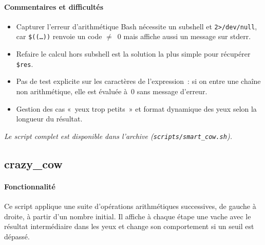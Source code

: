 \documentclass[a4paper,french,11pt]{article}
\begin{document}
\paragraph{Commentaires et difficultés}  
\begin{itemize}
  \item Capturer l’erreur d’arithmétique Bash nécessite un subshell et \texttt{2>/dev/null}, car \texttt{\$((…))} renvoie un code $\ne$ 0 mais affiche aussi un message sur stderr.  
  \item Refaire le calcul hors subshell est la solution la plus simple pour récupérer \texttt{\$res}.  
  \item Pas de test explicite sur les caractères de l’expression : si on entre une chaîne non arithmétique, elle est évaluée à 0 sans message d’erreur.  
  \item Gestion des cas « yeux trop petits » et format dynamique des yeux selon la longueur du résultat.  
\end{itemize}

\medskip
\noindent\emph{Le script complet est disponible dans l’archive (\texttt{scripts/smart\_cow.sh}).}

\newpage

\subsection{crazy\_cow}

\paragraph{Fonctionnalité}  
Ce script applique une suite d’opérations arithmétiques successives, de gauche à droite, à partir d’un nombre initial. Il affiche à chaque étape une vache avec le résultat intermédiaire dans les yeux et change son comportement si un seuil est dépassé.
\end{document}
